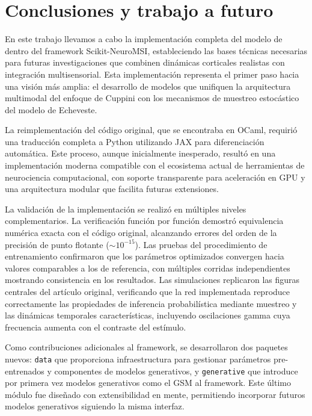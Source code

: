 \chapter{Conclusiones y trabajo a futuro}
\label{chapter:conclu}

En este trabajo llevamos a cabo la implementación completa del modelo de \citet{echeveste2020cortical} dentro del framework Scikit-NeuroMSI, estableciendo las bases técnicas necesarias para futuras investigaciones que combinen dinámicas corticales realistas con integración multisensorial. Esta implementación representa el primer paso hacia una visión más amplia: el desarrollo de modelos que unifiquen la arquitectura multimodal del enfoque de Cuppini con los mecanismos de muestreo estocástico del modelo de Echeveste.

La reimplementación del código original, que se encontraba en OCaml, requirió una traducción completa a Python utilizando JAX para diferenciación automática. Este proceso, aunque inicialmente inesperado, resultó en una implementación moderna compatible con el ecosistema actual de herramientas de neurociencia computacional, con soporte transparente para aceleración en \acrshort{GPU} y una arquitectura modular que facilita futuras extensiones.

La validación de la implementación se realizó en múltiples niveles complementarios. La verificación función por función demostró equivalencia numérica exacta con el código original, alcanzando errores del orden de la precisión de punto flotante ($\sim 10^{-15}$). Las pruebas del procedimiento de entrenamiento confirmaron que los parámetros optimizados convergen hacia valores comparables a los de referencia, con múltiples corridas independientes mostrando consistencia en los resultados. Las simulaciones replicaron las figuras centrales del artículo original, verificando que la red implementada reproduce correctamente las propiedades de inferencia probabilística mediante muestreo y las dinámicas temporales características, incluyendo oscilaciones gamma cuya frecuencia aumenta con el contraste del estímulo.

Como contribuciones adicionales al framework, se desarrollaron dos paquetes nuevos: \texttt{data} que proporciona infraestructura para gestionar parámetros pre-entrenados y componentes de modelos generativos, y \texttt{generative} que introduce por primera vez modelos generativos como el \acrshort{GSM} al framework. Este último módulo fue diseñado con extensibilidad en mente, permitiendo incorporar futuros modelos generativos siguiendo la misma interfaz.


